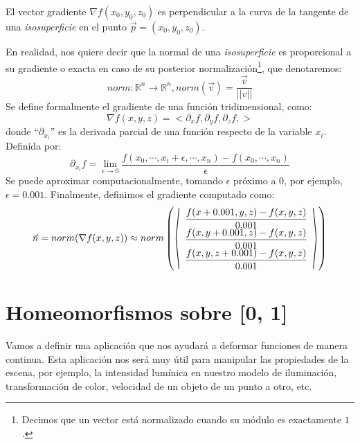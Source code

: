 \begin{theorem}
	El vector gradiente \(\nabla f(x_0, y_0, z_0)\)  es perpendicular a la curva de la tangente de una \textit{isosuperficie} en el punto \(\Vec{p}=(x_0, y_0, z_0)\).
\end{theorem}
En realidad, nos quiere decir que la normal de una \textit{isosuperficie} es proporcional a su gradiente o exacta en caso de su posterior normalización\footnote{Decimos que un vector está normalizado cuando su módulo es exactamente \(1\) .}, que denotaremos:
\[norm:\mathbb{R}^n\longrightarrow\mathbb{R}^n, norm(\Vec{v})=\dfrac{\Vec{v}}{\vert\vert v \vert\vert}\]
Se define formalmente el gradiente de una función tridimensional, como:
\[ \nabla f(x, y, z)= < \partial_x f, \partial_y f, \partial_z f, > \]
donde \enquote{\(\partial_{x_i}\)} es la derivada parcial de una función respecto de la variable \(x_i\). Definida por: 
\[ \partial_{x_i}f=\lim_{\epsilon\longrightarrow 0}\dfrac{f(x_0,\cdots,x_i+\epsilon,\cdots,x_n)-f(x_0, \cdots, x_n)}{\epsilon} \]
Se puede aproximar computacionalmente, tomando \(\epsilon\) próximo a \(0\), por ejemplo, \(\epsilon = 0.001\).
Finalmente, definimos el gradiente computado como:
\[
\Vec{n}=norm(\nabla f(x, y, z))\approx norm\left(
\stretchleftright[1000]{\langle}
{\begin{array}{c}
\dfrac{f(x+0.001,y,z)-f(x,y,z)}{0.001}\\
\dfrac{f(x,y+0.001,z)-f(x,y,z)}{0.001}\\
\dfrac{f(x,y,z+0.001)-f(x,y,z)}{0.001} \end{array}}
{\rangle}\right)
\]

\section{Homeomorfismos sobre [0, 1]}

Vamos a definir una aplicación que nos ayudará a deformar funciones de manera continua. Esta aplicación nos será muy útil para manipular las propiedades de la escena, por ejemplo, la intensidad lumínica en nuestro modelo de iluminación, transformación de color, velocidad de un objeto de un punto a otro, etc.

